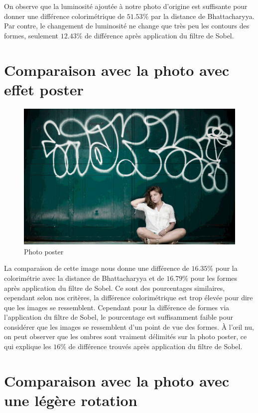 \documentclass[]{article}
\begin{document}
On observe que la luminosité ajoutée à notre photo d'origine est
suffisante pour donner une différence colorimétrique de $51.53\%$ par la
distance de Bhattacharyya. Par contre, le changement de luminosité ne
change que très peu les contours des formes, seulement $12.43\%$ de
différence après application du filtre de Sobel.

\newpage

\section{Comparaison avec la photo avec effet
poster}\label{comparaison-avec-la-photo-avec-effet-poster}

\begin{figure}[htbp]
\centering
\includegraphics{photos/poster.jpg}
\caption{Photo poster}
\end{figure}

La comparaison de cette image nous donne une différence de $16.35\%$
pour la colorimétrie avec la distance de Bhattacharyya et de $16.79\%$
pour les formes après application du filtre de Sobel. Ce sont des
pourcentages similaires, cependant selon nos critères, la différence
colorimétrique est trop élevée pour dire que les images se ressemblent.
Cependant pour la différence de formes via l'application du filtre de
Sobel, le pourcentage est suffisamment faible pour considérer que les
images se ressemblent d'un point de vue des formes. À l'\oe il nu, on
peut observer que les ombres sont vraiment délimités sur la photo
poster, ce qui explique les $16\%$ de différence trouvés après
application du filtre de Sobel.

\newpage

\section{Comparaison avec la photo avec une légère
rotation}\label{comparaison-avec-la-photo-avec-une-luxe9guxe8re-rotation}
\end{document}
